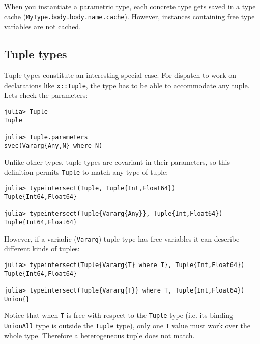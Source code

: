 When you instantiate a parametric type, each concrete type gets saved in a type cache (\texttt{MyType.body.body.name.cache}). However, instances containing free type variables are not cached.



\hypertarget{15137612054834825471}{}


\subsection{Tuple types}



Tuple types constitute an interesting special case.  For dispatch to work on declarations like \texttt{x::Tuple}, the type has to be able to accommodate any tuple.  Let{\textquotesingle}s check the parameters:




\begin{verbatim}
julia> Tuple
Tuple

julia> Tuple.parameters
svec(Vararg{Any,N} where N)
\end{verbatim}



Unlike other types, tuple types are covariant in their parameters, so this definition permits \texttt{Tuple} to match any type of tuple:




\begin{verbatim}
julia> typeintersect(Tuple, Tuple{Int,Float64})
Tuple{Int64,Float64}

julia> typeintersect(Tuple{Vararg{Any}}, Tuple{Int,Float64})
Tuple{Int64,Float64}
\end{verbatim}



However, if a variadic (\texttt{Vararg}) tuple type has free variables it can describe different kinds of tuples:




\begin{verbatim}
julia> typeintersect(Tuple{Vararg{T} where T}, Tuple{Int,Float64})
Tuple{Int64,Float64}

julia> typeintersect(Tuple{Vararg{T}} where T, Tuple{Int,Float64})
Union{}
\end{verbatim}



Notice that when \texttt{T} is free with respect to the \texttt{Tuple} type (i.e. its binding \texttt{UnionAll} type is outside the \texttt{Tuple} type), only one \texttt{T} value must work over the whole type. Therefore a heterogeneous tuple does not match.



